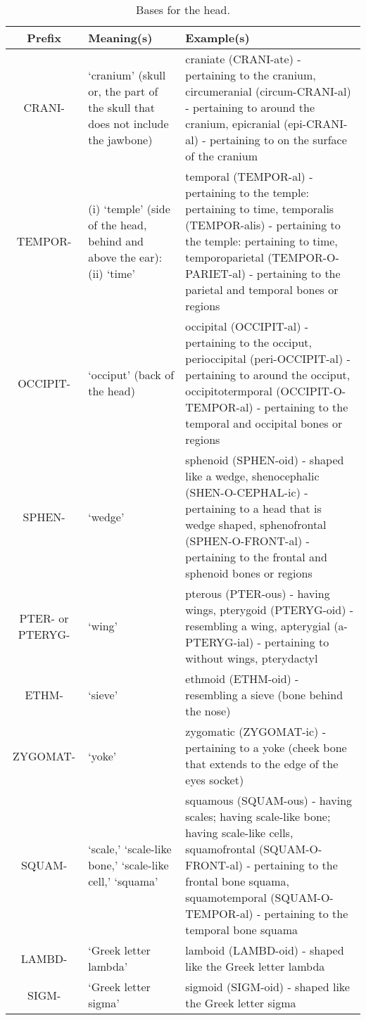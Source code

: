 \begin{longtable}{c | p{} | p{}}
    \caption{Bases for the head.}
    \hline
    Prefix & Meaning(s) & Example(s) \\ \hline
        CRANI- & `cranium' (skull or, the part of the skull that does not include the jawbone) & craniate (CRANI-ate) - pertaining to the cranium, circumeranial (circum-CRANI-al) - pertaining to around the cranium, epicranial (epi-CRANI-al) - pertaining to on the surface of the cranium \\
        TEMPOR- & (i) `temple' (side of the head, behind and above the ear): (ii) `time' & temporal (TEMPOR-al) - pertaining to the temple: pertaining to time, temporalis (TEMPOR-alis) - pertaining to the temple: pertaining to time, temporoparietal (TEMPOR-O-PARIET-al) - pertaining to the parietal and temporal bones or regions \\
        OCCIPIT- & `occiput' (back of the head) & occipital (OCCIPIT-al) - pertaining to the occiput, perioccipital (peri-OCCIPIT-al) - pertaining to around the occiput, occipitotermporal (OCCIPIT-O-TEMPOR-al) - pertaining to the temporal and occipital bones or regions \\
        SPHEN- & `wedge' & sphenoid (SPHEN-oid) - shaped like a wedge, shenocephalic (SHEN-O-CEPHAL-ic) - pertaining to a head that is wedge shaped, sphenofrontal (SPHEN-O-FRONT-al) - pertaining to the frontal and sphenoid bones or regions \\
        PTER- or PTERYG- & `wing' & pterous (PTER-ous) - having wings, pterygoid (PTERYG-oid) - resembling a wing, apterygial (a-PTERYG-ial) - pertaining to without wings, pterydactyl \\
        ETHM- & `sieve' & ethmoid (ETHM-oid) - resembling a sieve (bone behind the nose) \\
        ZYGOMAT- & `yoke' & zygomatic (ZYGOMAT-ic) - pertaining to a yoke (cheek bone that extends to the edge of the eyes socket) \\
        SQUAM- & `scale,' `scale-like bone,' `scale-like cell,' `squama' & squamous (SQUAM-ous) - having scales; having scale-like bone; having scale-like cells, squamofrontal (SQUAM-O-FRONT-al) - pertaining to the frontal bone squama, squamotemporal (SQUAM-O-TEMPOR-al) - pertaining to the temporal bone squama \\
        LAMBD- & `Greek letter lambda' & lamboid (LAMBD-oid) - shaped like the Greek letter lambda \\
        SIGM- & `Greek letter sigma' & sigmoid (SIGM-oid) - shaped like the Greek letter sigma \\

\end{longtable}
